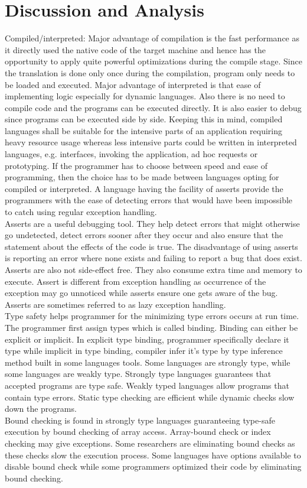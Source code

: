 \documentclass{sig-alternate}
\begin{document}
	
	\section{Discussion and Analysis}
	Compiled/interpreted: Major advantage of compilation is the fast performance as it directly used the native code of the target machine and hence has the opportunity to apply quite powerful optimizations during the compile stage. Since the translation is done only once during the compilation, program only needs to be loaded and executed. Major advantage of interpreted is that ease of implementing logic especially for dynamic languages. Also there is no need to compile code and the programs can be executed directly. It is also easier to debug since programs can be executed side by side. Keeping this in mind, compiled languages shall be suitable for the intensive parts of an application requiring heavy resource usage whereas less intensive parts could be written in interpreted languages, e.g. interfaces, invoking the application, ad hoc requests or prototyping. If the programmer has to choose between speed and ease of programming, then the choice has to be made between languages opting for compiled or interpreted. A language having the facility of asserts provide the programmers with the ease of detecting errors that would have been impossible to catch using regular exception handling.\\
	Asserts are a useful debugging tool. They help detect errors that might otherwise go undetected, detect errors sooner after they occur and also ensure that the statement about the effects of the code is true. The disadvantage of using asserts is reporting an error where none exists and failing to report a bug that does exist. Asserts are also not side-effect free. They also consume extra time and memory to execute. Assert is different from exception handling as occurrence of the exception may go unnoticed while asserts ensure one gets aware of the bug. Asserts are sometimes referred to as lazy exception handling.\\
	Type safety helps programmer for the minimizing type errors occurs at run time. The programmer first assign types which is called binding. Binding can either be explicit or implicit. In explicit type binding, programmer specifically declare it type while implicit in type binding, compiler infer it's type by type inference method built in some languages tools. Some languages are strongly type, while some languages are weakly type. Strongly type languages guarantees that accepted programs are type safe. Weakly typed languages allow programs that contain type errors. Static type checking are efficient while dynamic checks slow down the programs. \\
	Bound checking is found in strongly type languages guaranteeing type-safe execution by bound checking of array access. Array-bound check or index checking may give exceptions. Some researchers are eliminating bound checks as these checks slow the execution process. Some languages have options available to disable bound check while some programmers optimized their code by eliminating bound checking.
	
\end{document}
